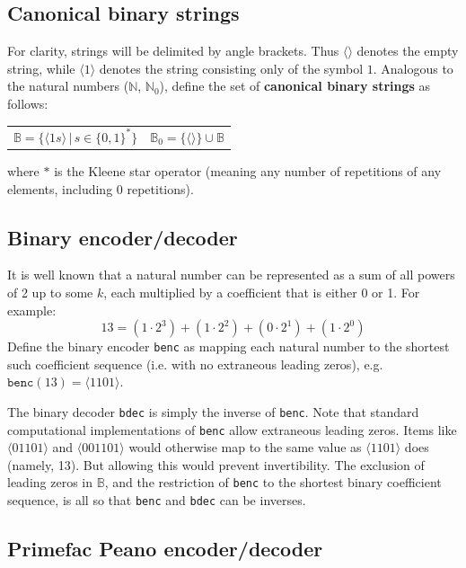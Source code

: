 \documentclass[12pt,reqno]{article}
\begin{document}
\subsection{Canonical binary strings}

For clarity, strings will be delimited by angle brackets. Thus $\langle \rangle$ denotes the empty string, while $\langle 1 \rangle$ denotes the string consisting only of the symbol $1$. Analogous to the natural numbers ($\mathbb{N}$, $\mathbb{N}_0$), define the set of \textbf{canonical binary strings} as follows:

\begin{center} \begin{tabular}{lr} 
    $\mathbb{B} = \{ \langle 1s \rangle \, | \, s \in \{0,1\}^{*} \}$ & $\mathbb{B}_0 = \{ \langle \rangle \} \cup \mathbb{B}$
\end{tabular} \end{center}
where $*$ is the Kleene star operator (meaning any number of repetitions of any elements, including 0 repetitions).

\subsection{Binary encoder/decoder}

It is well known that a natural number can be represented as a sum of all powers of 2 up to some $k$, each multiplied by a coefficient that is either 0 or 1. For example:
\begin{equation}
  13 = (1 \cdot 2^3) + (1 \cdot 2^2) + (0 \cdot 2^1) + (1 \cdot 2^0)
\end{equation}
Define the binary encoder \texttt{benc} as mapping each natural number to the shortest such coefficient sequence (i.e. with no extraneous leading zeros), e.g. $\texttt{benc}(13) = \langle 1101 \rangle$.

The binary decoder \texttt{bdec} is simply the inverse of \texttt{benc}. Note that standard computational implementations of \texttt{benc} allow extraneous leading zeros. Items like $\langle 01101 \rangle$ and $\langle 001101 \rangle$ would otherwise map to the same value as $\langle 1101 \rangle$ does (namely, 13). But allowing this would prevent invertibility. The exclusion of leading zeros in $\mathbb{B}$, and the restriction of \texttt{benc} to the shortest binary coefficient sequence, is all so that \texttt{benc} and \texttt{bdec} can be inverses.

\subsection{Primefac Peano encoder/decoder}
\end{document}
